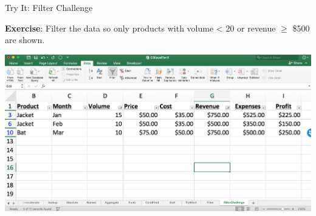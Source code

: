 \documentclass[xcolor=svgnames]{beamer}
\begin{document}
\begin{frame}{Try It: Filter Challenge}
\begin{exampleblock}{}
{\bf Exercise}: Filter the data so only products with volume < 20 or revenue $\geq$ \$500 are shown.\end{exampleblock}


\begin{center}
 \includegraphics[width=.99\textwidth]{FilterChallenge}
\end{center}
\end{frame}
\end{document}
